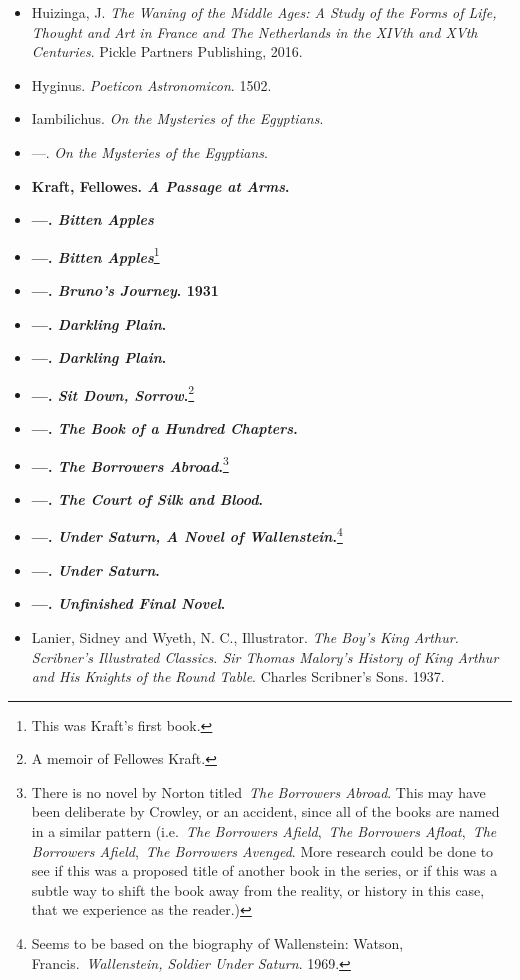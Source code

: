 \documentclass[12pt]{article}
\begin{document}
\begin{itemize}
\item
  Huizinga, J. \emph{The Waning of the Middle Ages: A Study of the Forms of Life, Thought and Art in France and The Netherlands in the XIVth and XVth Centuries}. Pickle Partners Publishing, 2016.
\item
  Hyginus. \emph{Poeticon Astronomicon}. 1502.
\item
  Iambilichus. \emph{On the Mysteries of the Egyptians}.
\item
  ---. \emph{On the Mysteries of the Egyptians}.
\item
  \textbf{Kraft, Fellowes. \emph{A Passage at Arms}.}
\item
  \textbf{---. \emph{Bitten Apples}}
\item
  \textbf{---. \emph{Bitten Apples}}\footnote{This was Kraft's first book.}
\item
  \textbf{---. \emph{Bruno's Journey}. 1931}
\item
  \textbf{---. \emph{Darkling Plain}.}
\item
  \textbf{---. \emph{Darkling Plain}.}
\item
  \textbf{---. \emph{Sit Down, Sorrow}.}\footnote{A memoir of Fellowes Kraft.}
\item
  \textbf{---. \emph{The Book of a Hundred Chapters}.}
\item
  \textbf{---. \emph{The Borrowers Abroad}.}\footnote{There is no novel by Norton titled~\emph{The Borrowers Abroad}. This may have been deliberate by Crowley, or an accident, since all of the books are named in a similar pattern (i.e.~\emph{The Borrowers Afield},~\emph{The Borrowers Afloat},~\emph{The Borrowers Afield},~\emph{The Borrowers Avenged}. More research could be done to see if this was a proposed title of another book in the series, or if this was a subtle way to shift the book away from the reality, or history in this case, that we experience as the reader.)}
\item
  \textbf{---. \emph{The Court of Silk and Blood}.}
\item
  \textbf{---. \emph{Under Saturn, A Novel of Wallenstein}.}\footnote{Seems to be based on the biography of Wallenstein: Watson, Francis.~\emph{Wallenstein, Soldier Under Saturn}. 1969.}
\item
  \textbf{---. \emph{Under Saturn}.}
\item
  \textbf{---. \emph{Unfinished Final Novel}.}
\item
  Lanier, Sidney and Wyeth, N. C., Illustrator. \emph{The Boy's King Arthur. Scribner's Illustrated Classics. Sir Thomas Malory's History of King Arthur and His Knights of the Round Table}. Charles Scribner's Sons. 1937.

\end{itemize}
\end{document}
